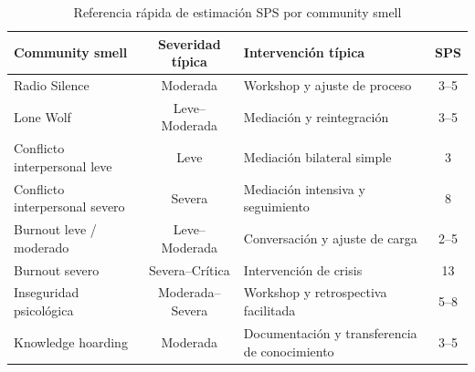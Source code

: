\begin{table}[h]
    \centering
    \footnotesize
    \begin{tabularx}{\textwidth}{|l|c|X|c|}
        \hline
        \textbf{Community smell} & \textbf{Severidad típica}                     & \textbf{Intervención típica} & \textbf{SPS} \\
        \hline
        Radio Silence
                                 & Moderada
                                 & Workshop y ajuste de proceso
                                 & 3--5                                                                                        \\
        \hline
        Lone Wolf
                                 & Leve--Moderada
                                 & Mediación y reintegración
                                 & 3--5                                                                                        \\
        \hline
        Conflicto interpersonal leve
                                 & Leve
                                 & Mediación bilateral simple
                                 & 3                                                                                           \\
        \hline
        Conflicto interpersonal severo
                                 & Severa
                                 & Mediación intensiva y seguimiento
                                 & 8                                                                                           \\
        \hline
        Burnout leve / moderado
                                 & Leve--Moderada
                                 & Conversación y ajuste de carga
                                 & 2--5                                                                                        \\
        \hline
        Burnout severo
                                 & Severa--Crítica
                                 & Intervención de crisis
                                 & 13                                                                                          \\
        \hline
        Inseguridad psicológica
                                 & Moderada--Severa
                                 & Workshop y retrospectiva facilitada
                                 & 5--8                                                                                        \\
        \hline
        Knowledge hoarding
                                 & Moderada
                                 & Documentación y transferencia de conocimiento
                                 & 3--5                                                                                        \\
        \hline
    \end{tabularx}
    \caption{Referencia rápida de estimación SPS por community smell}
    \label{tab:referencia-sps}
\end{table}
\FloatBarrier

